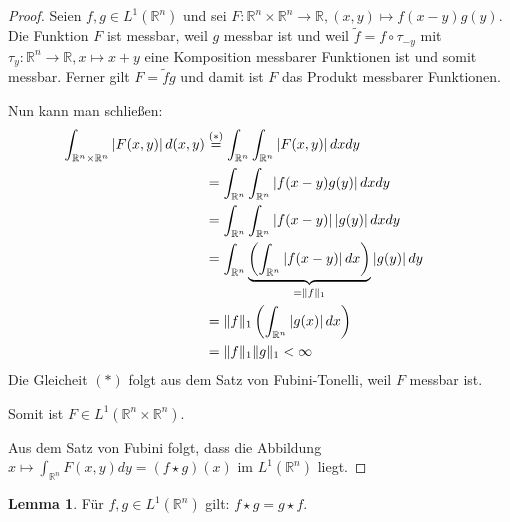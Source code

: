 \documentclass{article}
\newcommand{\R}[0]{\mathbb{R}}
\theoremstyle{plain}
\theoremstyle{definition}
\newtheorem{lemma}[thm]{Lemma}
\begin{document}
\begin{proof}
    Seien $f,g \in L^1(\R^n)$ und sei $F: \R^n \times \R^n \to \R, (x,y) \mapsto f(x - y)g(y)$. Die Funktion $F$ ist messbar,
    weil $g$ messbar ist und weil $\tilde{f} = f \circ \tau_{-y}$ mit $\tau_y: \R^n \to \R, x \mapsto x + y$ eine Komposition messbarer Funktionen ist
    und somit messbar. Ferner gilt $F = \tilde{f}g$ und damit ist $F$ das Produkt messbarer Funktionen.

    Nun kann man schließen:
    \begin{align*}
        \hspace{-23px}\int_{\R^n \times \R^n} \left| F(x,y)\right| d(x,y) &\overset{(*)}{=} \int_{\R^n}\int_{\R^n} \left| F(x,y)\right| dxdy \\
        &= \int_{\R^n}\int_{\R^n} \left|f(x - y)g(y)\right| dxdy \\
        &= \int_{\R^n}\int_{\R^n} \left| f(x - y) \right| \left| g(y) \right| dx dy \\
        &= \int_{\R^n} \underbrace{\left(\int_{\R^n} \left| f(x - y) \right| dx \right)}_{=\lVert f \rVert_1} \left| g(y) \right| dy \\
        &= \lVert f \rVert_1 \left(\int_{\R^n} \left| g(x) \right| dx\right) \\ 
        &= \lVert f \rVert_1 \lVert g \rVert_1 < \infty
    \end{align*}
    Die Gleicheit $(*)$ folgt aus dem Satz von Fubini-Tonelli, weil $F$ messbar ist.

    Somit ist $F \in L^1(\R^n \times \R^n)$.
    
    Aus dem Satz von Fubini folgt, dass die Abbildung $x \mapsto \int_{\R^n} F(x,y) dy = (f\star g)(x)$ im $L^1(\R^n)$ liegt.
\end{proof}

\begin{lemma}\label{lem:convsym}
    Für $f,g \in L^1(\R^n)$ gilt: $f \star g = g \star f$.
\end{lemma}
\end{document}
